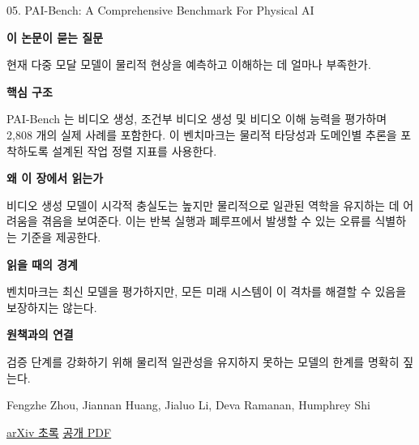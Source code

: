 \documentclass[11pt,openany]{book}
\begin{document}
\begin{termcard}{05. PAI-Bench: A Comprehensive Benchmark For Physical AI}

\par

\medskip

{\sffamily\bfseries\color{deepblue} 이 논문이 묻는 질문}\par

현재 다중 모달 모델이 물리적 현상을 예측하고 이해하는 데 얼마나 부족한가.

\smallskip

{\sffamily\bfseries\color{deepblue} 핵심 구조}\par

PAI-Bench 는 비디오 생성, 조건부 비디오 생성 및 비디오 이해 능력을 평가하며 2,808 개의 실제 사례를 포함한다. 이 벤치마크는 물리적 타당성과 도메인별 추론을 포착하도록 설계된 작업 정렬 지표를 사용한다.

\smallskip

{\sffamily\bfseries\color{deepblue} 왜 이 장에서 읽는가}\par

비디오 생성 모델이 시각적 충실도는 높지만 물리적으로 일관된 역학을 유지하는 데 어려움을 겪음을 보여준다. 이는 반복 실행과 폐루프에서 발생할 수 있는 오류를 식별하는 기준을 제공한다.

\smallskip

{\sffamily\bfseries\color{coral} 읽을 때의 경계}\par

벤치마크는 최신 모델을 평가하지만, 모든 미래 시스템이 이 격차를 해결할 수 있음을 보장하지는 않는다.

\smallskip

{\sffamily\bfseries\color{teal} 원책과의 연결}\par

검증 단계를 강화하기 위해 물리적 일관성을 유지하지 못하는 모델의 한계를 명확히 짚는다.

\medskip

{\footnotesize\color{muted} Fengzhe Zhou, Jiannan Huang, Jialuo Li, Deva Ramanan, Humphrey Shi\par

\href{https://arxiv.org/abs/2512.01989}{arXiv 초록} \quad \href{https://arxiv.org/pdf/2512.01989}{공개 PDF}\par}

\end{termcard}
\end{document}
